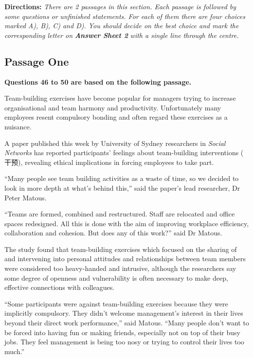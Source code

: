 \documentclass[UTF8,11pt]{ctexart}
\begin{document}
\textbf{Directions: }\textit{There are 2 passages in this section. Each passage is followed by some questions or} \textit{unfinished statements. For each of them there are four choices marked A), B), C) and D). You should} \textit{decide on the best choice and mark the corresponding letter on }\textbf{\textit{Answer Sheet 2}}\textit{ with a single line} \textit{through the centre.}


\subsection*{\textbf{Passage One}}


\textbf{Questions 46 to 50 are based on the following passage.}


Team-building exercises have become popular for managers trying to increase organisational and team harmony and productivity. Unfortunately many employees resent compulsory bonding and often regard these exercises as a nuisance.


A paper published this week by University of Sydney researchers in \textit{Social Networks} has reported participants’ feelings about team-building interventions ( 干预), revealing ethical implications in forcing employees to take part.


“Many people see team building activities as a waste of time, so we decided to look in more depth at what’s behind this,” said the paper’s lead researcher, Dr Peter Matous.


“Teams are formed, combined and restructured. Staff are relocated and office spaces redesigned. All this is done with the aim of improving workplace efficiency, collaboration and cohesion. But does any of this work?” said Dr Matous.


The study found that team-building exercises which focused on the sharing of and intervening into personal attitudes and relationships between team members were considered too heavy-handed and intrusive, although the researchers say some degree of openness and vulnerability is often necessary to make deep, effective connections with colleagues.


“Some participants were against team-building exercises because they were implicitly compulsory. They didn’t welcome management’s interest in their lives beyond their direct work performance,” said Matous. “Many people don’t want to be forced into having fun or making friends, especially not on top of their busy jobs. They feel management is being too nosy or trying to control their lives too much.”
\end{document}
